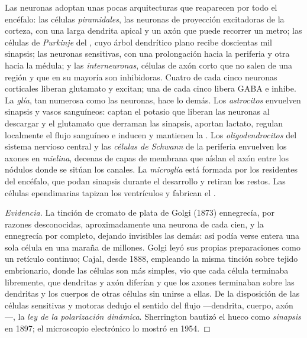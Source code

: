\begin{definition}\label{def:b3:nervous-systems:cells}
Las neuronas adoptan unas pocas arquitecturas que reaparecen por todo
el encéfalo: las células \emph{piramidales}, las neuronas de proyección
excitadoras de la corteza, con una larga dendrita apical y un axón que
puede recorrer un metro; las células de \emph{Purkinje} del ,
cuyo árbol dendrítico plano recibe doscientas mil sinapsis; las
neuronas sensitivas, con una prolongación hacia la periferia y otra
hacia la médula; y las \emph{interneuronas}, células de axón corto que
no salen de una región y que en su mayoría son inhibidoras. Cuatro de
cada cinco neuronas corticales liberan glutamato y excitan; una de cada
cinco libera GABA e inhibe. La \emph{glía}, tan numerosa como las
neuronas, hace lo demás. Los \emph{astrocitos} envuelven sinapsis y
vasos sanguíneos: captan el potasio que liberan las neuronas al
descargar y el glutamato que derraman las sinapsis, aportan lactato,
regulan localmente el flujo sanguíneo e inducen y mantienen la . Los \emph{oligodendrocitos} del sistema nervioso
central y las \emph{células de Schwann} de la periferia envuelven los
axones en \emph{mielina}, decenas de capas de membrana que aíslan el
axón entre los nódulos donde se sitúan los canales. La
\emph{microglía} está formada por los  residentes del
encéfalo, que podan sinapsis durante el desarrollo y retiran los
restos. Las células ependimarias tapizan los ventrículos y fabrican el
.
\end{definition}

\begin{proof}[Evidencia]
La tinción de cromato de plata de Golgi (1873) ennegrecía, por razones
desconocidas, aproximadamente una neurona de cada cien, y la ennegrecía
por completo, dejando invisibles las demás: así podía verse entera una
sola célula en una maraña de millones. Golgi leyó sus propias
preparaciones como un retículo continuo; Cajal, desde 1888, empleando
la misma tinción sobre tejido embrionario, donde las células son más
simples, vio que cada célula terminaba libremente, que dendritas y axón
diferían y que los axones terminaban sobre las dendritas y los cuerpos
de otras células sin unirse a ellas. De la disposición de las células
sensitivas y motoras dedujo el sentido del flujo ---dendrita, cuerpo,
axón---, la \emph{ley de la polarización dinámica}. Sherrington
bautizó el hueco como \emph{sinapsis} en 1897; el microscopio
electrónico lo mostró en 1954.
\end{proof}

